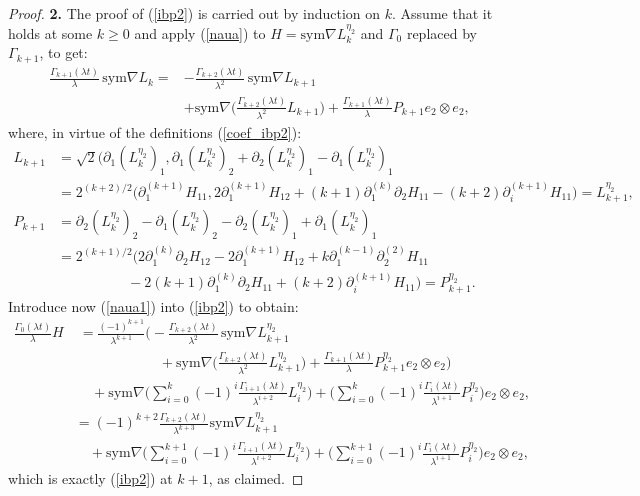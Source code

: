 \documentclass[reqno,twoside,11pt]{amsart}
\newcommand{\sym}{\mathrm{sym}}
\numberwithin{equation}{section}
\theoremstyle{plain}
\theoremstyle{definition}
\begin{document}
\begin{proof}
{\bf 2.} The proof of (\ref{ibp2}) is carried out by induction on $k$. 
Assume that it holds at some $k\geq 0$ and apply (\ref{naua}) to
$H=\sym\nabla L_k^{\eta_2}$ and $\Gamma_0$ replaced by $\Gamma_{k+1}$, to get:
\begin{equation}\label{naua1}
\begin{split}
\frac{\Gamma_{k+1}(\lambda t)}{\lambda}\,\sym\nabla L_k
 = & -\frac{\Gamma_{k+2}(\lambda
  t)}{\lambda^{2}} \, \sym\nabla L_{k+1}  \\ & + \sym\nabla
\Big(\frac{\Gamma_{k+2}(\lambda t)}{\lambda^{2}} L_{k+1}\Big) 
+ \frac{\Gamma_{k+1}(\lambda t)}{\lambda} P_{k+1} e_2\otimes e_2,
\end{split}
\end{equation}
where, in virtue of the definitions (\ref{coef_ibp2}):
\begin{equation*} 
\begin{split}
L_{k+1} & =  \sqrt{2}(\partial_1(L_k^{\eta_2})_1, \partial_1(L_k^{\eta_2})_2
 + \partial_2(L_k^{\eta_2})_1 - \partial_1(L_k^{\eta_2})_1 \\ &
= 2^{(k+2)/2}\big(\partial_1^{(k+1)}H_{11}, 
2\partial_1^{(k+1)}H_{12} + (k+1) \partial_1^{(k)}\partial_2H_{11}- (k+2)\partial_i^{(k+1)}H_{11})
= L_{k+1}^{\eta_2},\\
P_{k+1} & = \partial_2(L_k^{\eta_2})_2-\partial_1(L_k^{\eta_2})_2-\partial_2(L_k^{\eta_2})_1
+ \partial_1(L_k^{\eta_2})_1 \\ &
=  {2}^{(k+1)/2}\big(2\partial_1^{(k)}\partial_2H_{12}-2\partial_1^{(k+1)}H_{12} +
k\partial_1^{(k-1)}\partial_2^{(2)}H_{11} \\ & \qquad\qquad \quad -2(k+1)\partial_1^{(k)}\partial_2H_{11}+
(k+2)\partial_i^{(k+1)}H_{11} \big) = P_{k+1}^{\eta_2}.
\end{split}
\end{equation*}
Introduce now (\ref{naua1}) into (\ref{ibp2}) to obtain:
\begin{equation*} 
\begin{split}
\frac{\Gamma_0(\lambda t)}{\lambda}H & \; = 
\frac{(-1)^{k+1}}{\lambda^{k+1}} \Big(-\frac{\Gamma_{k+2}(\lambda
  t)}{\lambda^{2}} \, \sym\nabla L_{k+1}^{\eta_2}  \\ & \qquad\qquad
\qquad + \sym\nabla \Big(\frac{\Gamma_{k+2}(\lambda t)}{\lambda^{2}} L_{k+1}^{\eta_2}\Big) 
+ \frac{\Gamma_{k+1}(\lambda t)}{\lambda} P_{k+1}^{\eta_2} e_2\otimes e_2\Big)
\\ & \quad\, + \sym\nabla
\Big(\sum_{i=0}^k(-1)^i\frac{\Gamma_{i+1}(\lambda
  t)}{\lambda^{i+2}} L_i^{\eta_2}\Big) 
+ \Big( \sum_{i=0}^{k}(-1)^i\frac{\Gamma_i(\lambda t)}{\lambda^{i+1}} P_i^{\eta_2}\Big) e_2\otimes e_2,
\\ & =(-1)^{k+2}\frac{\Gamma_{k+2}(\lambda
  t)}{\lambda^{k+3}} \sym\nabla L_{k+1}^{\eta_2}  \\ & \quad + \sym\nabla
\Big(\sum_{i=0}^{k+1}(-1)^i\frac{\Gamma_{i+1}(\lambda t)}{\lambda^{i+2}} L_i^{\eta_2}\Big) 
+ \Big( \sum_{i=0}^{k+1}(-1)^i\frac{\Gamma_i(\lambda t)}{\lambda^{i+1}} P_i^{\eta_2}\Big) e_2\otimes e_2,
\end{split}
\end{equation*}
which is exactly (\ref{ibp2}) at $k+1$, as claimed.
\end{proof}
\end{document}
